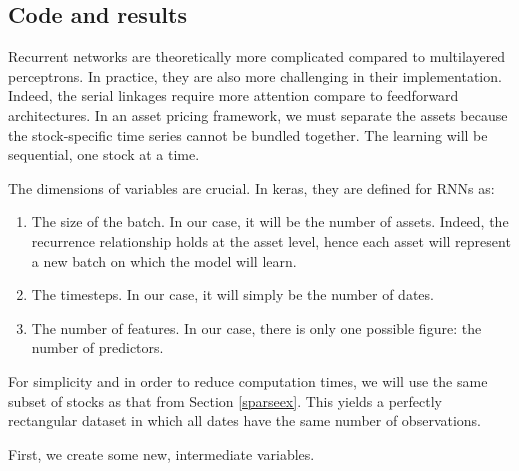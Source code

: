 \documentclass[]{krantz}
\providecommand{\tightlist}{%
  \setlength{\itemsep}{0pt}\setlength{\parskip}{0pt}}
\theoremstyle{definition}
\theoremstyle{definition}
\theoremstyle{definition}
\theoremstyle{remark}
\begin{document}
\hypertarget{code-and-results-3}{%
\subsection{Code and results}\label{code-and-results-3}}

Recurrent networks are theoretically more complicated compared to
multilayered perceptrons. In practice, they are also more challenging in
their implementation. Indeed, the serial linkages require more attention
compare to feedforward architectures. In an asset pricing framework, we
must separate the assets because the stock-specific time series cannot
be bundled together. The learning will be sequential, one stock at a
time.

The dimensions of variables are crucial. In keras, they are defined for
RNNs as:

\begin{enumerate}
\def\labelenumi{\arabic{enumi}.}
\tightlist
\item
  The size of the batch. In our case, it will be the number of assets.
  Indeed, the recurrence relationship holds at the asset level, hence
  each asset will represent a new batch on which the model will learn.\\
\item
  The timesteps. In our case, it will simply be the number of dates.\\
\item
  The number of features. In our case, there is only one possible
  figure: the number of predictors.
\end{enumerate}

For simplicity and in order to reduce computation times, we will use the
same subset of stocks as that from Section \ref{sparseex}. This yields a
perfectly rectangular dataset in which all dates have the same number of
observations.

First, we create some new, intermediate variables. \footnotesize
\end{document}
